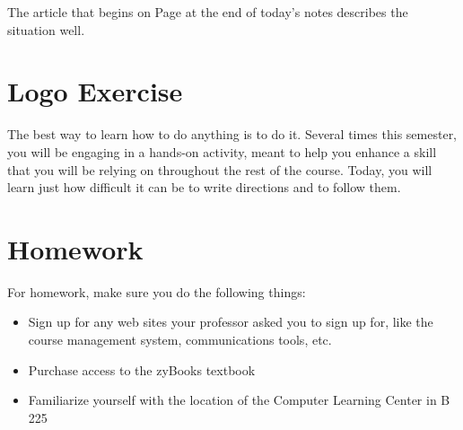 The article that begins on Page \pageref{cnn} at the end of today's notes describes the situation well.

\section{Logo Exercise}

The best way to learn how to do anything is to do it.  Several times this semester, you will be engaging in a hands-on activity, meant to help you enhance a skill that you will be relying on throughout the rest of the course.  Today, you will learn just how difficult it can be to write directions and to follow them.

\section{Homework}

For homework, make sure you do the following things:
\begin{itemize}
\item Sign up for any web sites your professor asked you to sign up for, like the course management system, communications tools, etc.
\item Purchase access to the zyBooks textbook
\item Familiarize yourself with the location of the Computer Learning Center in B 225
\end{itemize}

\newpage
\label{cnn}

